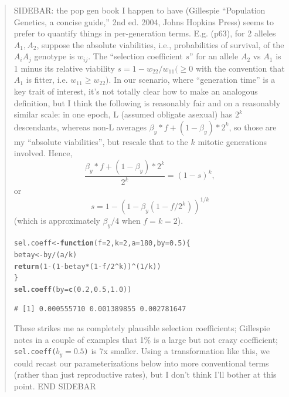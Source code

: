 \documentclass{article}\usepackage[]{graphicx}\usepackage[]{color}
\makeatletter
\newcommand{\hlnum}[1]{\textcolor[rgb]{0.686,0.059,0.569}{#1}}%
\newcommand{\hlopt}[1]{\textcolor[rgb]{0,0,0}{#1}}%
\newcommand{\hlstd}[1]{\textcolor[rgb]{0.345,0.345,0.345}{#1}}%
\newcommand{\hlkwa}[1]{\textcolor[rgb]{0.161,0.373,0.58}{\textbf{#1}}}%
\newcommand{\hlkwb}[1]{\textcolor[rgb]{0.69,0.353,0.396}{#1}}%
\newcommand{\hlkwc}[1]{\textcolor[rgb]{0.333,0.667,0.333}{#1}}%
\newcommand{\hlkwd}[1]{\textcolor[rgb]{0.737,0.353,0.396}{\textbf{#1}}}%
\newenvironment{kframe}{%
 \def\at@end@of@kframe{}%
 \ifinner\ifhmode%
  \def\at@end@of@kframe{\end{minipage}}%
  \begin{minipage}{\columnwidth}%
 \fi\fi%
 \def\FrameCommand##1{\hskip\@totalleftmargin \hskip-\fboxsep
 \colorbox{shadecolor}{##1}\hskip-\fboxsep
     \hskip-\linewidth \hskip-\@totalleftmargin \hskip\columnwidth}%
 \MakeFramed {\advance\hsize-\width
   \@totalleftmargin\z@ \linewidth\hsize
   \@setminipage}}%
 {\par\unskip\endMakeFramed%
 \at@end@of@kframe}
\newenvironment{knitrout}{}{} %
\makeatother
\begin{document}
\begin{quote} 
  SIDEBAR: the pop gen book I happen to have (Gillespie ``Population Genetics, a concise guide,''
  2nd ed. 2004, Johns Hopkins Press) seems to prefer to quantify things in per-generation terms.
  E.g. (p63), for 2 alleles $A_1, A_2$, suppose the absolute viabilities, i.e., probabilities of
  survival, of the $A_iA_j$ genotype is $w_{ij}$.  The ``selection coefficient $s$'' for an allele
  $A_2$ vs $A_1$ is 1 minus its relative viability $s=1-w_{22}/w_{11} ( \ge 0$ with the convention
  that $A_1$ is fitter, i.e. $w_{11} \ge w_{22})$.  In our scenario, where ``generation time'' is a
  key trait of interest, it's not totally clear how to make an analogous definition, but I think the
  following is reasonably fair and on a reasonably similar scale: in one epoch, L (assumed obligate
  asexual) has $2^k$ descendants, whereas non-L averages $\beta_y*f + (1-\beta_y)*2^k$, so those are
  my ``absolute viabilities'', but rescale that to the $k$ mitotic generations involved.
  Hence, $$\frac{\beta_y*f + (1-\beta_y)*2^k}{2^k} = (1-s)^k,$$
  or $$s=1-\left(1-\beta_y(1-f/2^k)\right)^{1/k}$$ (which is approximately $\beta_y/4$ when
  $f=k=2$).

\begin{knitrout}\footnotesize
{}\color{fgcolor}\begin{kframe}
\begin{alltt}
\hlstd{sel.coeff} \hlkwb{<-} \hlkwa{function}\hlstd{(}\hlkwc{f}\hlstd{=}\hlnum{2}\hlstd{,} \hlkwc{k}\hlstd{=}\hlnum{2}\hlstd{,} \hlkwc{a}\hlstd{=}\hlnum{180}\hlstd{,} \hlkwc{by}\hlstd{=}\hlnum{0.5}\hlstd{)\{}
  \hlstd{betay} \hlkwb{<-} \hlstd{by}\hlopt{/}\hlstd{(a}\hlopt{/}\hlstd{k)}
  \hlkwd{return}\hlstd{(}\hlnum{1}\hlopt{-}\hlstd{(}\hlnum{1}\hlopt{-}\hlstd{betay}\hlopt{*}\hlstd{(}\hlnum{1}\hlopt{-}\hlstd{f}\hlopt{/}\hlnum{2}\hlopt{^}\hlstd{k))}\hlopt{^}\hlstd{(}\hlnum{1}\hlopt{/}\hlstd{k))}
\hlstd{\}}
\hlkwd{sel.coeff}\hlstd{(}\hlkwc{by}\hlstd{=}\hlkwd{c}\hlstd{(}\hlnum{0.2}\hlstd{,} \hlnum{0.5}\hlstd{,} \hlnum{1.0}\hlstd{))}
\end{alltt}
\begin{verbatim}
# [1] 0.000555710 0.001389855 0.002781647
\end{verbatim}
\end{kframe}
\end{knitrout}

  These strikes me as completely plausible selection coefficients; Gillespie notes in a couple of
  examples that 1\% is a large but not crazy coefficient; \texttt{sel.coeff($b_y=0.5$)} is 7x smaller.
  Using a transformation like this, we could recast our parameterizations below into more conventional
  terms (rather than just reproductive rates), but I don't think I'll bother at this point.  END
  SIDEBAR
\end{quote}
\end{document}
